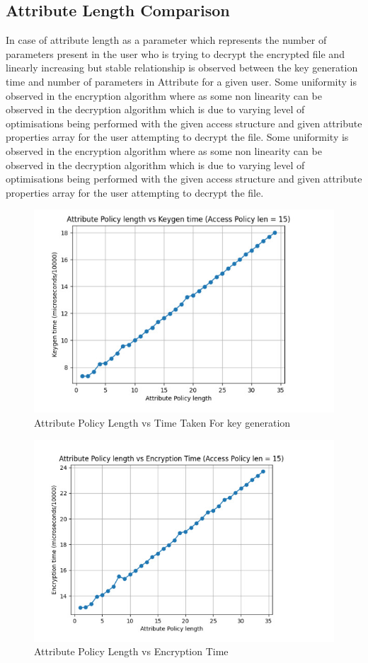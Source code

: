 \subsection{Attribute Length Comparison}
In case of attribute length as  a parameter which represents the number of parameters present in the user who is trying to decrypt the encrypted file and linearly increasing but stable relationship is observed between the key generation time and number of parameters in Attribute for a given user.
Some uniformity is observed in the encryption algorithm where as some non linearity can be observed in the decryption algorithm which is due to varying level of optimisations being performed with the given access structure and given attribute properties array for the user attempting to decrypt the file.
Some uniformity is observed in the encryption algorithm where as some non linearity can be observed in the decryption algorithm which is due to varying level of optimisations being performed with the given access structure and given attribute properties array for the user attempting to decrypt the file.

\begin{figure}[h]
    \centering
    \includegraphics[width=0.75\linewidth]{Images/AttributeLenghtVsKeyGen.jpeg}
 
    \caption{Attribute Policy Length vs Time Taken For key generation }
    \label{fig:enter-label}
\end{figure}


\begin{figure}
    \centering
    \includegraphics[width=0.75\linewidth]{Images/AttributeLenghtVsEncryptionTime.jpeg}
    \caption{Attribute Policy Length vs Encryption Time }
    \label{fig:enter-label}
\end{figure}


